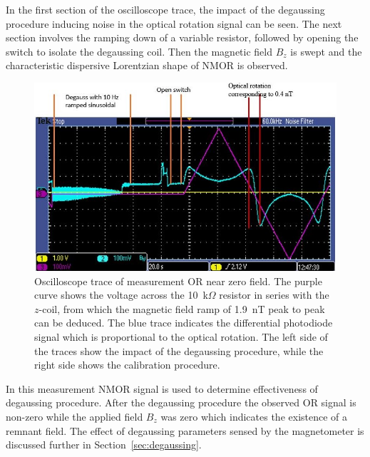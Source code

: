 In the first section of the oscilloscope trace, the impact of the
degaussing procedure inducing noise in the optical rotation signal can
be seen.  The next section involves the ramping down of a variable
resistor, followed by opening the switch to isolate the degaussing
coil.  Then the magnetic field $B_z$ is swept and the characteristic
dispersive Lorentzian shape of NMOR is observed.

\begin{figure}%
\centering\includegraphics[width=0.7\linewidth]{figures/scope_trace_of_field_sweeping}
\caption{Oscilloscope trace of measurement OR near zero field. The
  purple curve shows the voltage across the 10~k$\Omega$ resistor in
  series with the $z$-coil, from which the magnetic field ramp of
  1.9~nT peak to peak can be deduced.  The blue trace indicates the
  differential photodiode signal which is proportional to the optical
  rotation.  The left side of the traces show the impact of the
  degaussing procedure, while the right side shows the calibration
  procedure.\label{fig:TUNE} }
\end{figure}


In this measurement NMOR signal is used to determine effectiveness of
degaussing procedure. After the degaussing procedure the observed OR
signal is non-zero while the applied field $B_z$ was zero which
indicates the existence of a remnant field.  The effect of degaussing
parameters sensed by the magnetometer is discussed further in
Section~\ref{sec:degaussing}.




